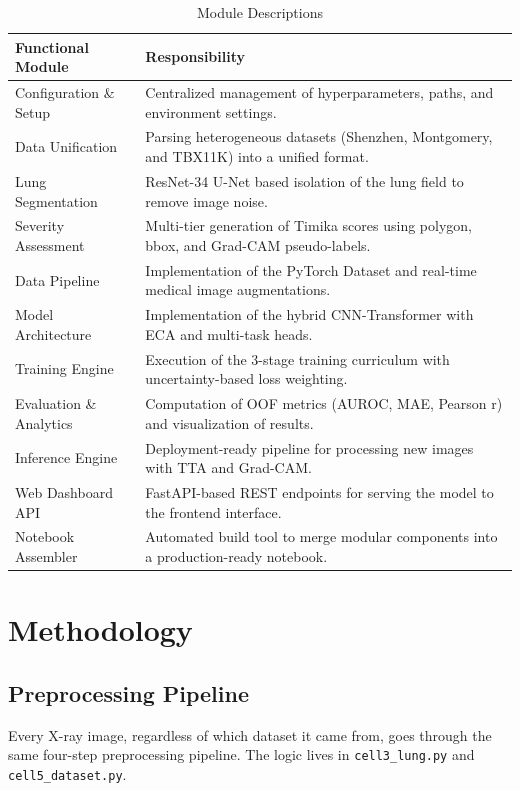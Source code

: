 \documentclass[12pt]{report}
\begin{document}
\begin{table}[H]
\centering
\caption{Module Descriptions}
\label{tab:modules}
\small
\renewcommand{\arraystretch}{1.2}
\begin{tabular}{|l|p{8cm}|}
\hline
\textbf{Functional Module} & \textbf{Responsibility} \\
\hline
Configuration \& Setup & Centralized management of hyperparameters, paths, and environment settings. \\
Data Unification & Parsing heterogeneous datasets (Shenzhen, Montgomery, and TBX11K) into a unified format. \\
Lung Segmentation & ResNet-34 U-Net based isolation of the lung field to remove image noise. \\
Severity Assessment & Multi-tier generation of Timika scores using polygon, bbox, and Grad-CAM pseudo-labels. \\
Data Pipeline & Implementation of the PyTorch Dataset and real-time medical image augmentations. \\
Model Architecture & Implementation of the hybrid CNN-Transformer with ECA and multi-task heads. \\
Training Engine & Execution of the 3-stage training curriculum with uncertainty-based loss weighting. \\
Evaluation \& Analytics & Computation of OOF metrics (AUROC, MAE, Pearson r) and visualization of results. \\
Inference Engine & Deployment-ready pipeline for processing new images with TTA and Grad-CAM. \\
Web Dashboard API & FastAPI-based REST endpoints for serving the model to the frontend interface. \\
Notebook Assembler & Automated build tool to merge modular components into a production-ready notebook. \\
\hline
\end{tabular}
\end{table}

\chapter{Methodology}
\doublespacing

\section{Preprocessing Pipeline}

Every X-ray image, regardless of which dataset it came from, goes through the same four-step preprocessing pipeline. The logic lives in \texttt{cell3\_lung.py} and \texttt{cell5\_dataset.py}.
\end{document}

